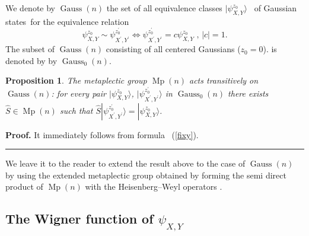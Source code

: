 \documentclass[11pt]{article}%
\newtheorem{proposition}[theorem]{Proposition}
\newenvironment{proof}[1][Proof]{\noindent\textbf{#1.} }{\ \rule{0.5em}{0.5em}}
\begin{document}
We denote by $\operatorname*{Gauss}(n)$ the set of all equivalence classes
$|\psi_{X,Y}^{z_{0}}\rangle$ \ of Gaussian states\ for the equivalence
relation
\[
\psi_{X,Y}^{z_{0}}\sim\psi_{X^{\prime},Y^{\prime}}^{z_{0}^{\prime}%
}\Leftrightarrow\psi_{X^{\prime},Y^{\prime}}^{z_{0}^{\prime}}=c\psi
_{X,Y}^{z_{0}}\text{ \ , \ }|c|=1.
\]
The subset of $\operatorname*{Gauss}(n)$ consisting of all centered Gaussians
($z_{0}=0$). is denoted by by $\operatorname*{Gauss}_{0}(n)$.

\begin{proposition}
The metaplectic group $\operatorname*{Mp}(n)$ acts transitively on
$\operatorname*{Gauss}(n)$: for every pair $|\psi_{X,Y}^{z_{0}}\rangle$,
$|\psi_{X^{\prime},Y^{\prime}}^{z_{0}^{\prime}}\rangle$ in
$\operatorname*{Gauss}_{0}(n)$ there exists $\hat{S}\in\operatorname*{Mp}(n)$
such that $\hat{S}|\psi_{X^{\prime},Y^{\prime}}^{z_{0}^{\prime}}\rangle
=|\psi_{X,Y}^{z_{0}}\rangle$.
\end{proposition}

\begin{proof}
It immediately follows from formula \ (\ref{fixy}).
\end{proof}

We leave it to the reader to extend the result above to the case of
$\operatorname*{Gauss}(n)$ by using the extended metaplectic group obtained by
forming the semi direct product of $\operatorname*{Mp}(n)$ with the
Heisenberg--Weyl operators \cite{Folland,Birk,Birkbis}.

\subsection{The Wigner function of $\psi_{X,Y}$}
\end{document}
